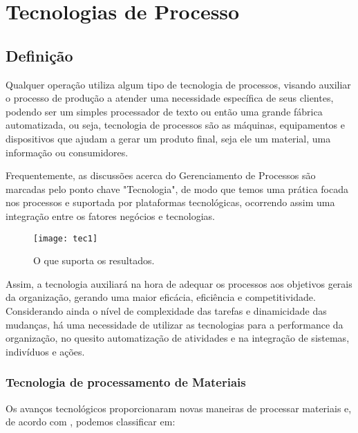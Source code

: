 \chapter[Tecnologias de Processo]{Tecnologias de Processo}
\label{chap:tecnologias}
	
	\section[Definição]{Definição}
	\label{sec:tecnologias_definicao}

		Qualquer operação utiliza algum tipo de tecnologia de processos, visando auxiliar o processo de produção a atender uma necessidade específica de seus clientes, podendo ser um simples processador de texto ou então uma grande fábrica automatizada, ou seja, tecnologia de processos são as máquinas, equipamentos e dispositivos que ajudam a gerar um produto final, seja ele um material, uma informação ou consumidores.\cite{slack}

		Frequentemente, as discussões acerca do Gerenciamento de Processos são marcadas pelo ponto chave "Tecnologia", de modo que temos uma prática focada nos processos e suportada por plataformas tecnológicas, ocorrendo assim uma integração entre os fatores negócios e tecnologias.\cite{lecom} 

		\begin{figure}[h]
			\centering
			\texttt{[image: tec1]}
			\caption[O que suporta os resultados]{O que suporta os resultados.}
			\label{fig:tec1}
		\end{figure}

		Assim, a tecnologia auxiliará na hora de adequar os processos aos objetivos gerais da organização, gerando uma maior eficácia, eficiência e competitividade. Considerando ainda o nível de complexidade das tarefas e dinamicidade das mudanças, há uma necessidade de utilizar as tecnologias para a performance da organização, no quesito automatização de atividades e na integração de sistemas, indivíduos e ações. 

		\subsection[Tecnologia de processamento de Materiais]{Tecnologia de processamento de Materiais}
		\label{sec:tecnologias_definicao_materiais}

			Os avanços tecnológicos proporcionaram novas maneiras de processar materiais e, de acordo com \cite{slack}, podemos classificar em:

